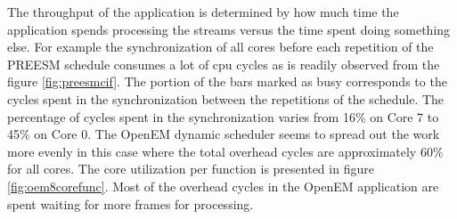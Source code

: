 The throughput of the application is determined by how much time the application spends processing the streams versus the time spent doing something else. For example the synchronization of all cores before each repetition of the PREESM schedule consumes a lot of cpu cycles as is readily observed from the figure \ref{fig:preesmcif}. The portion of the bars marked as busy corresponds to the cycles spent in the synchronization between the repetitions of the schedule. The percentage of cycles spent in the synchronization varies from 16\% on Core 7 to 45\% on Core 0. The OpenEM dynamic scheduler seems to spread out the work more evenly in this case where the total overhead cycles are approximately 60\% for all cores. The core utilization per function is presented in figure \ref{fig:oem8corefunc}. Most of the overhead cycles in the OpenEM application are spent waiting for more frames for processing.

